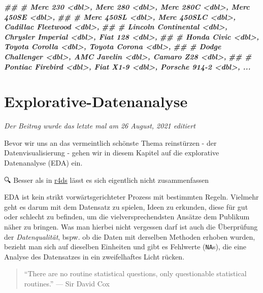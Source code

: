 \documentclass[
]{article}
\newenvironment{Shaded}{\begin{snugshade}}{\end{snugshade}}
\newcommand{\DocumentationTok}[1]{\textcolor[rgb]{0.56,0.35,0.01}{\textbf{\textit{#1}}}}
\begin{document}
\begin{Shaded}
\begin{Highlighting}[]
\DocumentationTok{\#\# \#   Merc 230 \textless{}dbl\textgreater{}, Merc 280 \textless{}dbl\textgreater{}, Merc 280C \textless{}dbl\textgreater{}, Merc 450SE \textless{}dbl\textgreater{},}
\DocumentationTok{\#\# \#   Merc 450SL \textless{}dbl\textgreater{}, Merc 450SLC \textless{}dbl\textgreater{}, Cadillac Fleetwood \textless{}dbl\textgreater{},}
\DocumentationTok{\#\# \#   Lincoln Continental \textless{}dbl\textgreater{}, Chrysler Imperial \textless{}dbl\textgreater{}, Fiat 128 \textless{}dbl\textgreater{},}
\DocumentationTok{\#\# \#   Honda Civic \textless{}dbl\textgreater{}, Toyota Corolla \textless{}dbl\textgreater{}, Toyota Corona \textless{}dbl\textgreater{},}
\DocumentationTok{\#\# \#   Dodge Challenger \textless{}dbl\textgreater{}, AMC Javelin \textless{}dbl\textgreater{}, Camaro Z28 \textless{}dbl\textgreater{},}
\DocumentationTok{\#\# \#   Pontiac Firebird \textless{}dbl\textgreater{}, Fiat X1{-}9 \textless{}dbl\textgreater{}, Porsche 914{-}2 \textless{}dbl\textgreater{}, ...}
\end{Highlighting}
\end{Shaded}

\hypertarget{explorative-datenanalyse}{%
\section{Explorative-Datenanalyse}\label{explorative-datenanalyse}}

\emph{Der Beitrag wurde das letzte mal am 26 August, 2021 editiert}

Bevor wir uns an das vermeintlich schönste Thema reinstürzen - der Datenvisualisierung - gehen wir in diesem Kapitel auf die explorative Datenanalyse (EDA) ein.

🔍 Besser als in \href{https://r4ds.had.co.nz/exploratory-data-analysis.html}{r4ds} lässt es sich eigentlich nicht zusammenfassen

EDA ist kein strikt vorwärtsgerichteter Prozess mit bestimmten Regeln. Vielmehr geht es darum mit dem Datensatz zu spielen, Ideen zu erkunden, diese für gut oder schlecht zu befinden, um die vielversprechendsten Ansätze dem Publikum näher zu bringen. Was man hierbei nicht vergessen darf ist auch die Überprüfung der \emph{Datenqualität}, bspw. ob die Daten mit derselben Methoden erhoben wurden, bezieht man sich auf dieselben Einheiten und gibt es Fehlwerte (\texttt{NA}s), die eine Analyse des Datensatzes in ein zweifelhaftes Licht rücken.

\begin{quote}
``There are no routine statistical questions, only questionable statistical routines.'' --- Sir David Cox
\end{quote}
\end{document}
